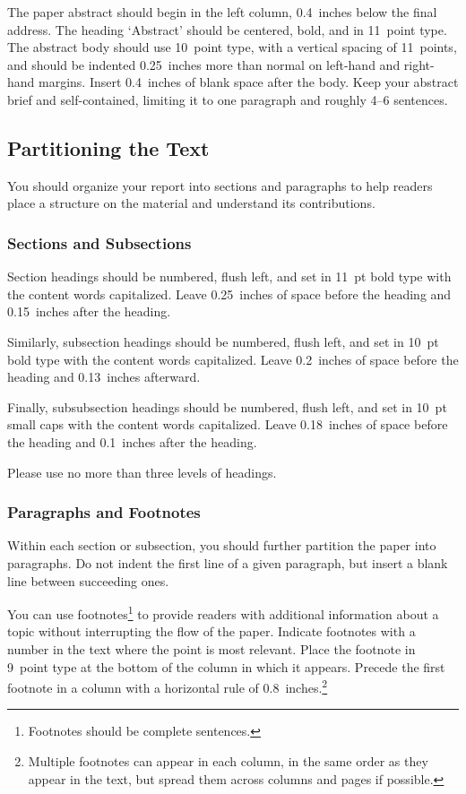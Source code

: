 \documentclass{article}
\begin{document}
The paper abstract should begin in the left column, 0.4~inches below the final
address. The heading `Abstract' should be centered, bold, and in 11~point type.
The abstract body should use 10~point type, with a vertical spacing of
11~points, and should be indented 0.25~inches more than normal on left-hand and
right-hand margins. Insert 0.4~inches of blank space after the body. Keep your
abstract brief and self-contained, limiting it to one paragraph and roughly 4--6
sentences.

\subsection{Partitioning the Text}

You should organize your report into sections and paragraphs to help
readers place a structure on the material and understand its
contributions.

\subsubsection{Sections and Subsections}

Section headings should be numbered, flush left, and set in 11~pt bold
type with the content words capitalized. Leave 0.25~inches of space
before the heading and 0.15~inches after the heading.

Similarly, subsection headings should be numbered, flush left, and set
in 10~pt bold type with the content words capitalized. Leave
0.2~inches of space before the heading and 0.13~inches afterward.

Finally, subsubsection headings should be numbered, flush left, and
set in 10~pt small caps with the content words capitalized. Leave
0.18~inches of space before the heading and 0.1~inches after the
heading.

Please use no more than three levels of headings.

\subsubsection{Paragraphs and Footnotes}

Within each section or subsection, you should further partition the
paper into paragraphs. Do not indent the first line of a given
paragraph, but insert a blank line between succeeding ones.

You can use footnotes\footnote{Footnotes
should be complete sentences.} to provide readers with additional
information about a topic without interrupting the flow of the paper.
Indicate footnotes with a number in the text where the point is most
relevant. Place the footnote in 9~point type at the bottom of the
column in which it appears. Precede the first footnote in a column
with a horizontal rule of 0.8~inches.\footnote{Multiple footnotes can
  appear in each column, in the same order as they appear in the text,
but spread them across columns and pages if possible.}
\end{document}
